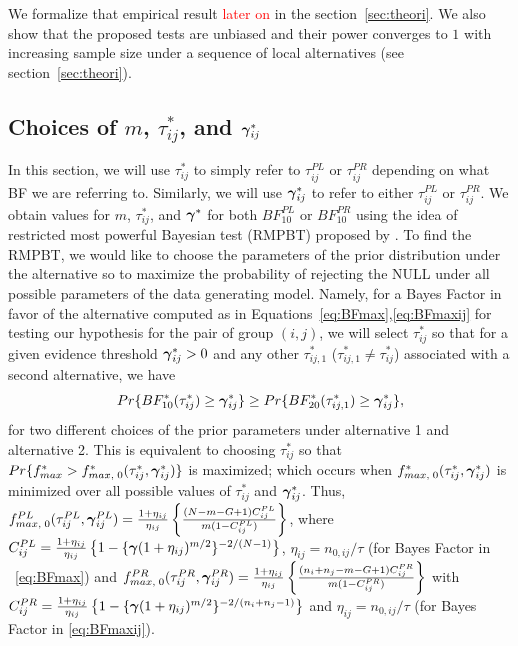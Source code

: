 \documentclass[times,sort&compress,3p]{elsarticle}
\theoremstyle{plain}%
\theoremstyle{definition}
\def\boldpsi{{\mbox{\boldmath $\psi$}}}
\newcommand{\ugamma}            {\mbox{\boldmath$\gamma$}}
\begin{document}
We formalize that empirical result \textcolor{red}{later on} in the section~\ref{sec:theori}. %
We also show that the proposed tests are unbiased and their power converges to $1$ with increasing sample size under a sequence of local alternatives (see section~\ref{sec:theori}).  

\subsection{Choices of $m$, $\tau^{*}_{ij}$, and $\ugamma^{*}_{ij}$} \label{sec:testmtaugam}
In this section, we will use $\tau^{*}_{ij}$ to simply refer to $\tau^{PL}_{ij}$ or $\tau^{PR}_{ij}$ depending on what BF we are referring to. Similarly, we will use $\ugamma^{*}_{ij}$ to refer to either $\tau^{PL}_{ij}$ or $\tau^{PR}_{ij}$. 
We obtain values for $m$, $\tau^{*}_{ij}$, and $\ugamma^{*}$ for both $BF^{PL}_{10}$ or $BF^{PR}_{10}$ using the idea of restricted most powerful Bayesian test (RMPBT) proposed by \citealp{GoddardJohnson,Goddard}. To find the RMPBT, we would like to choose the parameters of the prior distribution under the alternative so to maximize the probability of rejecting the NULL under all possible parameters of the data generating model. Namely, for a Bayes Factor in favor of the alternative computed as in Equations~\ref{eq:BFmax},\ref{eq:BFmaxij} for testing our hypothesis for the pair of group $(i,j)$, we will select $\tau^{*}_{ij}$ so that for a given evidence threshold $\ugamma^{*}_{ij} > 0$ and any other $\tau^{*}_{ij,1}$ ($\tau^{*}_{ij,1} \neq \tau^{*}_{ij}$) associated with a second alternative, we have
$$Pr\{BF^{*}_{10}(\tau^{*}_{ij}) \geq  \ugamma^{*}_{ij}\} \geq Pr\{BF^{*}_{20}(\tau^{*}_{ij,1}) \geq \ugamma^{*}_{ij} \},$$
for two different choices of the prior parameters under alternative 1 and alternative 2.
This is equivalent to choosing $\tau^{*}_{ij}$ so that $Pr\{f^{*}_{max} > f^{*}_{max,\;0}(\tau^{*}_{ij},\ugamma^{*}_{ij})\}$ is maximized; which occurs when $f^{*}_{max,\;0}(\tau^{*}_{ij},\ugamma^{*}_{ij})$ is minimized over all possible values of $\tau^{*}_{ij}$ and $\ugamma^{*}_{ij}$. Thus, $f^{PL}_{max,\;0}(\tau^{PL}_{ij},\ugamma^{PL}_{ij}) =\frac{1+\eta_{ij}}{\eta_{ij}} \left\{ \frac{(N - m -G+1)C^{PL}_{ij}}{m(1 - C^{PL}_{ij})} \right\}$, where $C^{PL}_{ij} = \frac{1+\eta_{ij}}{\eta_{ij}}\left\{ 1 - \{\ugamma(1+\eta_{ij})^{m/2} \}^{-2/(N-1)}  \right\}$, $\eta_{ij} = n_{0,ij}/\tau$ (for Bayes Factor in ~\ref{eq:BFmax}) and $f^{PR}_{max,\;0}(\tau^{PR}_{ij},\ugamma^{PR}_{ij}) =\frac{1+\eta_{ij}}{\eta_{ij}} \left\{ \frac{(n_i+n_j - m -G+1)C^{PR}_{ij}}{m(1 - C^{PR}_{ij})} \right\}$ with $C^{PR}_{ij} = \frac{1+\eta_{ij}}{\eta_{ij}}\left\{ 1 - \{\ugamma(1+\eta_{ij})^{m/2} \}^{-2/(n_i+n_j-1)} \right\}$ and $\eta_{ij} = n_{0,ij}/\tau$ (for Bayes Factor in \ref{eq:BFmaxij}). 
\end{document}
